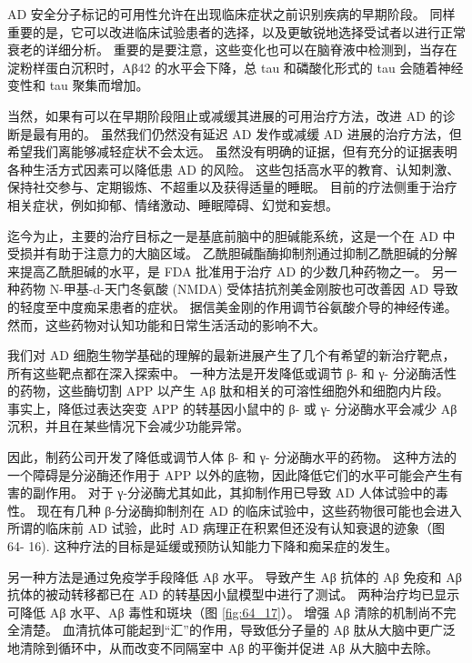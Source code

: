 AD 安全分子标记的可用性允许在出现临床症状之前识别疾病的早期阶段。 同样重要的是，它可以改进临床试验患者的选择，以及更敏锐地选择受试者以进行正常衰老的详细分析。 重要的是要注意，这些变化也可以在脑脊液中检测到，当存在淀粉样蛋白沉积时，Aβ42 的水平会下降，总 tau 和磷酸化形式的 tau 会随着神经变性和 tau 聚集而增加。

当然，如果有可以在早期阶段阻止或减缓其进展的可用治疗方法，改进 AD 的诊断是最有用的。 虽然我们仍然没有延迟 AD 发作或减缓 AD 进展的治疗方法，但希望我们离能够减轻症状不会太远。 虽然没有明确的证据，但有充分的证据表明各种生活方式因素可以降低患 AD 的风险。 这些包括高水平的教育、认知刺激、保持社交参与、定期锻炼、不超重以及获得适量的睡眠。 目前的疗法侧重于治疗相关症状，例如抑郁、情绪激动、睡眠障碍、幻觉和妄想。

迄今为止，主要的治疗目标之一是基底前脑中的胆碱能系统，这是一个在 AD 中受损并有助于注意力的大脑区域。 乙酰胆碱酯酶抑制剂通过抑制乙酰胆碱的分解来提高乙酰胆碱的水平，是 FDA 批准用于治疗 AD 的少数几种药物之一。 另一种药物 N-甲基-d-天门冬氨酸 (NMDA) 受体拮抗剂美金刚胺也可改善因 AD 导致的轻度至中度痴呆患者的症状。 据信美金刚的作用调节谷氨酸介导的神经传递。 然而，这些药物对认知功能和日常生活活动的影响不大。

我们对 AD 细胞生物学基础的理解的最新进展产生了几个有希望的新治疗靶点，所有这些靶点都在深入探索中。 一种方法是开发降低或调节 β- 和 γ- 分泌酶活性的药物，这些酶切割 APP 以产生 Aβ 肽和相关的可溶性细胞外和细胞内片段。 事实上，降低过表达突变 APP 的转基因小鼠中的 β- 或 γ- 分泌酶水平会减少 Aβ 沉积，并且在某些情况下会减少功能异常。

因此，制药公司开发了降低或调节人体 β- 和 γ- 分泌酶水平的药物。 这种方法的一个障碍是分泌酶还作用于 APP 以外的底物，因此降低它们的水平可能会产生有害的副作用。 对于 γ-分泌酶尤其如此，其抑制作用已导致 AD 人体试验中的毒性。 现在有几种 β-分泌酶抑制剂在 AD 的临床试验中，这些药物很可能也会进入所谓的临床前 AD 试验，此时 AD 病理正在积累但还没有认知衰退的迹象（图 64- 16). 这种疗法的目标是延缓或预防认知能力下降和痴呆症的发生。

另一种方法是通过免疫学手段降低 Aβ 水平。 导致产生 Aβ 抗体的 Aβ 免疫和 Aβ 抗体的被动转移都已在 AD 的转基因小鼠模型中进行了测试。 两种治疗均已显示可降低 Aβ 水平、Aβ 毒性和斑块（图 \ref{fig:64_17}）。 增强 Aβ 清除的机制尚不完全清楚。 血清抗体可能起到“汇”的作用，导致低分子量的 Aβ 肽从大脑中更广泛地清除到循环中，从而改变不同隔室中 Aβ 的平衡并促进 Aβ 从大脑中去除。

